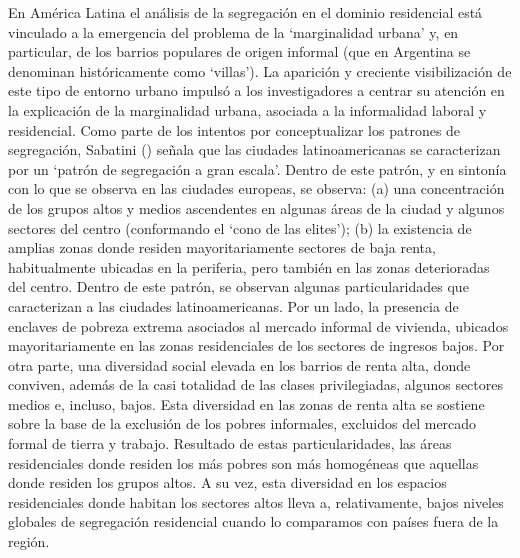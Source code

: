 \documentclass[
  spanish,
  a4paper,%
  chapterprefix=true,%
  DIV=calc,%
  twoside]{scrbook}%
\begin{document}
En América Latina el análisis de la segregación en el dominio
residencial está vinculado a la emergencia del problema de la
`marginalidad urbana' y, en particular, de los barrios populares de
origen informal (que en Argentina se denominan históricamente como
`villas'). La aparición y creciente visibilización de este tipo de
entorno urbano impulsó a los investigadores a centrar su atención en la
explicación de la marginalidad urbana, asociada a la informalidad
laboral y residencial.
Como
parte de los intentos por conceptualizar los patrones de segregación,
Sabatini () señala que las ciudades latinoamericanas se caracterizan
por un `patrón de segregación a gran escala'. Dentro de este patrón, y
en sintonía con lo que se observa en las ciudades europeas, se observa:
(a) una concentración de los grupos altos y medios ascendentes en
algunas áreas de la ciudad y algunos sectores del centro (conformando el
`cono de las elites'); (b) la existencia de amplias zonas donde residen
mayoritariamente sectores de baja renta, habitualmente ubicadas en la
periferia, pero también en las zonas deterioradas del centro. Dentro de
este patrón, se observan algunas particularidades que caracterizan a las
ciudades latinoamericanas. Por un lado, la presencia de enclaves de
pobreza extrema asociados al mercado informal de vivienda, ubicados
mayoritariamente en las zonas residenciales de los sectores de ingresos
bajos. Por otra parte, una diversidad social elevada en los barrios de
renta alta, donde conviven, además de la casi totalidad de las clases
privilegiadas, algunos sectores medios e, incluso, bajos. Esta
diversidad en las zonas de renta alta se sostiene sobre la base de la
exclusión de los pobres informales, excluidos del mercado formal de
tierra y trabajo. Resultado de estas particularidades, las áreas
residenciales donde residen los más pobres son más homogéneas que
aquellas donde residen los grupos altos. A su vez, esta diversidad en
los espacios residenciales donde habitan los sectores altos lleva a,
relativamente, bajos niveles globales de segregación residencial cuando
lo comparamos con países fuera de la región.
\end{document}
